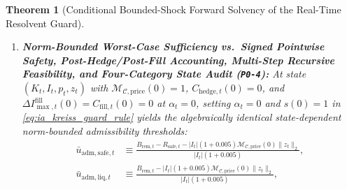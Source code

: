 \documentclass[12pt]{article}
\newtheorem{theorem}{Theorem}[section]
\theoremstyle{definition}
\theoremstyle{remark}
\begin{document}
\begin{theorem}[Conditional Bounded-Shock Forward Solvency of the Real-Time Resolvent Guard]
\begin{enumerate}
\item \textbf{Norm-Bounded Worst-Case Sufficiency vs.\ Signed Pointwise Safety, Post-Hedge/Post-Fill Accounting, Multi-Step Recursive Feasibility, and Four-Category State Audit (\texttt{P0-4}):} At state $(K_t, I_t, p_t, z_t)$ with $\mathcal{M}_{\mathcal{C},\mathrm{price}}(0) = 1$, $C_{\mathrm{hedge},t}(0) = 0$, and $\Delta I_{\max,t}^{\mathrm{fill}}(0) = C_{\mathrm{fill},t}(0) = 0$ at $\alpha_t = 0$, setting $\alpha_t = 0$ and $s(0)=1$ in \eqref{eq:ia_kreiss_guard_rule} yields the algebraically identical state-dependent norm-bounded admissibility thresholds:
\begin{equation}
\begin{aligned}
\bar{u}_{\mathrm{adm,safe},t} &\equiv \frac{B_{\mathrm{rem},t} - R_{\mathrm{safe},t} - |I_t|(1+0.005)\mathcal{M}_{\mathcal{C},\mathrm{price}}(0)\|z_t\|_2}{|I_t|(1 + 0.005)}, \\
\bar{u}_{\mathrm{adm,liq},t} &\equiv \frac{B_{\mathrm{rem},t} - |I_t|(1+0.005)\mathcal{M}_{\mathcal{C},\mathrm{price}}(0)\|z_t\|_2}{|I_t|(1 + 0.005)},
\end{aligned}
\end{equation}

\end{enumerate}
\end{theorem}
\end{document}
